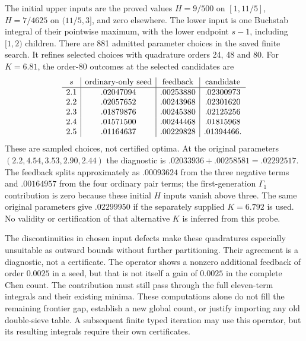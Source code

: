 The initial upper inputs are the proved values $H=9/500$ on
$[1,11/5]$, $H=7/4625$ on $(11/5,3]$, and zero elsewhere.
The lower input is one Buchstab integral of their pointwise maximum,
with the lower endpoint $s-1$, including $[1,2)$ children.
There are 881 admitted parameter choices in the saved finite search.
It refines selected choices with quadrature orders 24, 48 and 80.
For $K=6.81$, the order-80 outcomes at the selected candidates are
\[
\begin{array}{c|c|c|c}
s&\hbox{ordinary-only seed}&\hbox{feedback}&\hbox{candidate}\\\hline
2.1&.02047094&.00253880&.02300973\\
2.2&.02057652&.00243968&.02301620\\
2.3&.01879876&.00245380&.02125256\\
2.4&.01571500&.00244468&.01815968\\
2.5&.01164637&.00229828&.01394466.
\end{array}
\]
These are sampled choices, not certified optima.
At the original parameters $(2.2,4.54,3.53,2.90,2.44)$ the
diagnostic is $.02033936+.00258581=.02292517$.
The feedback splits approximately as $.00093624$ from the three
negative terms and $.00164957$ from the four ordinary pair terms;
the first-generation $\Gamma_1$ contribution is zero because these
initial $H$ inputs vanish above three.  The same original parameters
give $.02299950$ if the separately supplied $K=6.792$ is used.
No validity or certification of that alternative $K$ is inferred
from this probe.

The discontinuities in chosen input defects make these quadratures
especially unsuitable as outward bounds without further partitioning.
Their agreement is a diagnostic, not a certificate.  The operator
shows a nonzero additional feedback of order $0.0025$ in a seed,
but that is not itself a gain of $0.0025$ in the complete Chen count.
The contribution must still pass through the full eleven-term
integrals and their existing minima.  These computations alone do
not fill the remaining frontier gap, establish a new global count,
or justify importing any old double-sieve table.  A subsequent
finite typed iteration may use this operator, but its resulting
integrals require their own certificates.
